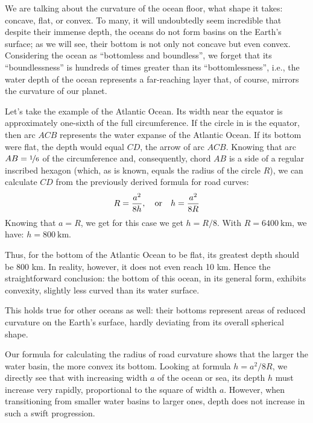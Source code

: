 We are talking about the curvature of the ocean floor, what shape it takes: concave, flat, or convex. To many, it will undoubtedly seem incredible that despite their immense depth, the oceans do not form basins on the Earth's surface; as we will see, their bottom is not only not concave but even convex. Considering the ocean as ``bottomless and boundless'', we forget that its ``boundlessness'' is hundreds of times greater than its ``bottomlessness'', i.e., the water depth of the ocean represents a far-reaching layer that, of course, mirrors the curvature of our planet.

Let's take the example of the Atlantic Ocean. Its width near the equator is approximately one-sixth of the full circumference. If the circle in  is the equator, then arc $ACB$ represents the water expanse of the Atlantic Ocean. If its bottom were flat, the depth would equal $CD$, the arrow of arc $ACB$. Knowing that arc $AB = \nicefrac{1}{6}$ of the circumference and, consequently, chord $AB$ is a side of a regular inscribed hexagon (which, as is known, equals the radius of the circle $R$), we can calculate $CD$ from the previously derived formula for road curves:
\begin{equation*}%
R = \frac{a^{2}}{8h}, \qor h = \frac{a^{2}}{8R}
\end{equation*}
Knowing that $a = R$, we get for this case we get $h = R/8$. With $R = \SI{6400}{\kilo\meter}$, we have: $h = \SI{800}{\kilo\meter}$.

Thus, for the bottom of the Atlantic Ocean to be flat, its greatest depth should be 800 km. In reality, however, it does not even reach 10 km. Hence the straightforward conclusion: the bottom of this ocean, in its general form, exhibits convexity, slightly less curved than its water surface.

This holds true for other oceans as well: their bottoms represent areas of reduced curvature on the Earth's surface, hardly deviating from its overall spherical shape.

Our formula for calculating the radius of road curvature shows that the larger the water basin, the more convex its bottom. Looking at formula $h = a^{2}/8R$, we directly see that with increasing width $a$ of the ocean or sea, its depth $h$ must increase very rapidly, proportional to the square of width $a$. However, when transitioning from smaller water basins to larger ones, depth does not increase in such a swift progression. 

